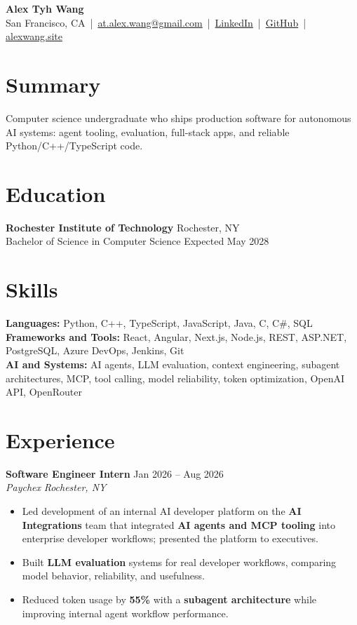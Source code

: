 \documentclass[10pt,letterpaper]{article}
\newif\ifresumeFirstRole
\newcommand{\resumeRole}[4]{%
  \ifresumeFirstRole
    \global\resumeFirstRolefalse
  \else
    \vspace{0pt plus 1fill}%
  \fi
  \textbf{#1} \hfill #2\\
  \textit{#3} \hfill \textit{#4}
}
\begin{document}
\begin{center}
{\Large \textbf{Alex Tyh Wang}}\\
San Francisco, CA \,|\, \href{mailto:at.alex.wang@gmail.com}{at.alex.wang@gmail.com} \,|\, \href{https://www.linkedin.com/in/alex-tyh-wang/}{LinkedIn} \,|\, \href{https://github.com/alextyhwang}{GitHub} \,|\, \href{https://alexwang.site}{alexwang.site}
\end{center}

\section*{Summary}
Computer science undergraduate who ships production software for autonomous AI systems: agent tooling, evaluation, full-stack apps, and reliable Python/C++/TypeScript code.

\section*{Education}
\textbf{Rochester Institute of Technology} \hfill Rochester, NY\\
Bachelor of Science in Computer Science \hfill Expected May 2028

\section*{Skills}
\textbf{Languages:} Python, C++, TypeScript, JavaScript, Java, C, C\#, SQL\\
\textbf{Frameworks and Tools:} React, Angular, Next.js, Node.js, REST, ASP.NET, PostgreSQL, Azure DevOps, Jenkins, Git\\
\textbf{AI and Systems:} AI agents, LLM evaluation, context engineering, subagent architectures, MCP, tool calling, model reliability, token optimization, OpenAI API, OpenRouter

\section*{Experience}
\resumeRole{Software Engineer Intern}{Jan 2026 -- Aug 2026}{Paychex}{Rochester, NY}
\begin{itemize}
  \item Led development of an internal AI developer platform on the \textbf{AI Integrations} team that integrated \textbf{AI agents and MCP tooling} into enterprise developer workflows; presented the platform to executives.
  \item Built \textbf{LLM evaluation} systems for real developer workflows, comparing model behavior, reliability, and usefulness.
  \item Reduced token usage by \textbf{55\%} with a \textbf{subagent architecture} while improving internal agent workflow performance.
\end{itemize}
\end{document}
